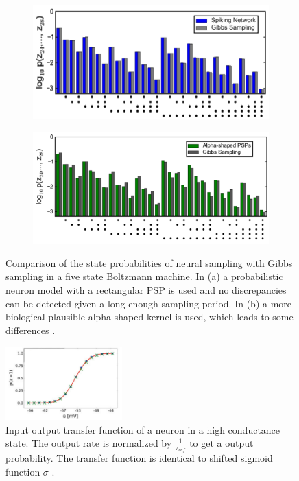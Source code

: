 \begin{figure}[h!]
	\centering
	\begin{subfigure}[t]{.50\textwidth}
  		\centering
  		\includegraphics[width=.8\linewidth]{imgs/snn_sample3.png}
  		\caption{}
  		\label{fig:sub1}
	\end{subfigure}%
	\begin{subfigure}[t]{.50\textwidth}
  		\centering
  		\includegraphics[width=.8\linewidth]{imgs/snn_sample4.png}
  		\caption{}
  		\label{fig:sub2}
	\end{subfigure}
	\caption[Comparison of the state probabilities of neural sampling with Gibbs sampling.]{Comparison of the state probabilities of neural sampling with Gibbs sampling in a five state Boltzmann machine. In (a) a probabilistic neuron model with a rectangular PSP is used and no discrepancies can be detected given a long enough sampling period. In (b) a more biological plausible alpha shaped kernel is used, which leads to some differences \cite{Buesing2011}.}
	\label{fig:snnsamp3}
\end{figure}


\begin{figure}
	\centering
    	\includegraphics[width=0.4\textwidth]{imgs/snn_sample5.png} 
    \caption[Input output transfer function of a neuron in a high conductance state.]{Input output transfer function of a neuron in a high conductance state. The output rate is normalized by $\frac{1}{\tau_{ref}}$ to get a output probability. The transfer function is identical to shifted sigmoid function $\sigma$  \cite{Petrovici2016}.}
	\label{fig:snnsamp4}
\end{figure}

